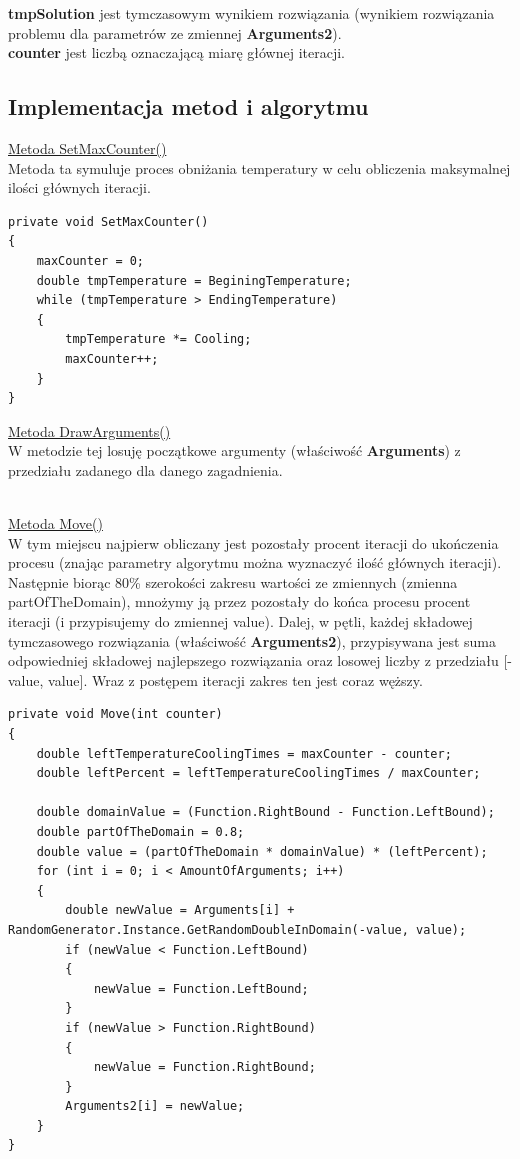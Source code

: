 \documentclass[twoside]{projektInzynierskiMS1}
\newcommand{\si}{ś}
\begin{document}
\textbf{tmpSolution} jest tymczasowym wynikiem rozwiązania (wynikiem rozwiązania problemu dla parametrów ze zmiennej \textbf{Arguments2}). \\

\textbf{counter} jest liczbą oznaczającą miarę głównej iteracji. \\

\subsection{Implementacja metod i algorytmu}

\underline{Metoda SetMaxCounter()} \\
Metoda ta symuluje proces obniżania temperatury w celu obliczenia maksymalnej ilo\si ci głównych iteracji. \\
\begin{verbatim}
private void SetMaxCounter()
{
    maxCounter = 0;
    double tmpTemperature = BeginingTemperature;
    while (tmpTemperature > EndingTemperature)
    {
        tmpTemperature *= Cooling;
        maxCounter++;
    }
}
\end{verbatim}

\underline{Metoda DrawArguments()} \\
W metodzie tej losuję początkowe argumenty (wła\si ciwo\si ć \textbf{Arguments}) z przedziału zadanego dla danego zagadnienia. \\\

\underline{Metoda Move()} \\
W tym miejscu najpierw obliczany jest pozostały procent iteracji do ukończenia procesu (znając parametry algorytmu można wyznaczyć ilo\si ć głównych iteracji). Następnie biorąc 80\% szeroko\si ci zakresu warto\si ci ze zmiennych (zmienna partOfTheDomain), mnożymy ją przez pozostały do końca procesu procent iteracji (i przypisujemy do zmiennej value). Dalej, w pętli, każdej składowej tymczasowego rozwiązania (wła\si ciwo\si ć \textbf{Arguments2}), przypisywana jest suma odpowiedniej składowej najlepszego rozwiązania oraz losowej liczby z przedziału [-value, value]. Wraz z postępem iteracji zakres ten jest coraz węższy. \\
\begin{verbatim}
private void Move(int counter)
{
    double leftTemperatureCoolingTimes = maxCounter - counter;
    double leftPercent = leftTemperatureCoolingTimes / maxCounter;

    double domainValue = (Function.RightBound - Function.LeftBound);
    double partOfTheDomain = 0.8;
    double value = (partOfTheDomain * domainValue) * (leftPercent);
    for (int i = 0; i < AmountOfArguments; i++)
    {
        double newValue = Arguments[i] + 
RandomGenerator.Instance.GetRandomDoubleInDomain(-value, value);
        if (newValue < Function.LeftBound)
        {
            newValue = Function.LeftBound;
        }
        if (newValue > Function.RightBound)
        {
            newValue = Function.RightBound;
        }
        Arguments2[i] = newValue;
    }
}
\end{verbatim}
\end{document}
